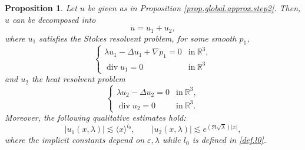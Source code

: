 \documentclass[11pt,a4paper]{article}
\numberwithin{equation}{section}
\newtheorem{proposition}[theorem]{Proposition}
{\theorembodyfont{\rmfamily}\newtheorem{remark}[theorem]{Remark}}
{\theorembodyfont{\rmfamily}\newtheorem{remarks}[theorem]{Remarks}}
\newcommand{\R}{\mathbb{R}}
\newcommand{\opdiv}{\operatorname{div}}
\newcommand{\eps}{\varepsilon}
\begin{document}
\begin{proposition}\label{prop.global.approx.step3}
Let $u$ be given as in Proposition \ref{prop.global.approx.step2}. Then, $u$ can be decomposed into 
\[
    u = u_1 + u_2, 
\]
where $u_1$ satisfies the Stokes resolvent problem, for some smooth $p_1$, 
\[
    \left\{
    \begin{array}{ll}
    \lambda u_1 - \Delta u_1 + \nabla p_1
    = 0&\mbox{in}\ \R^3, \\
    \opdiv u_1
    = 0&\mbox{in}\ \R^3 
    \end{array}\right.
\]
and $u_2$ the heat resolvent problem 
\[
    \left\{
    \begin{array}{ll}
    \lambda u_2 - \Delta u_2 
    = 0&\mbox{in}\ \R^3, \\
    \opdiv u_2
    = 0&\mbox{in}\ \R^3.
    \end{array}\right.
\]
Moreover, the following qualitative estimates hold: 
\begin{equation}\label{est.u1u2.qual}
    |u_1(x,\lambda)| 
    \lesssim
    \langle x \rangle^{l_0}, 
    \qquad
    |u_2(x,\lambda)| 
    \lesssim
    e^{(\Re\sqrt{\lambda}) |x|}, 
\end{equation}
where the implicit constants depend on $\eps, \lambda$ while $l_0$ is defined in \eqref{def.l0}.
\end{proposition}
\end{document}
